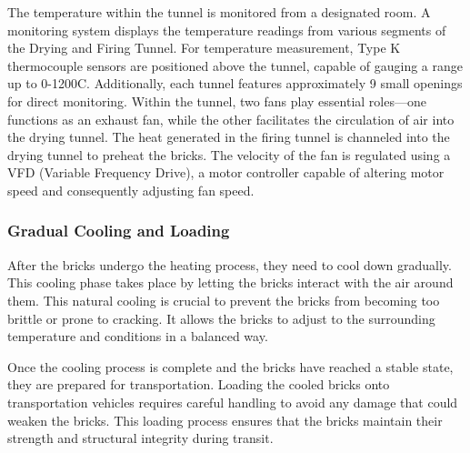 \vspace{0.1cm}
The temperature within the tunnel is monitored from a designated room. A monitoring system displays the temperature readings from various segments of the Drying and Firing Tunnel. For temperature measurement, Type K thermocouple sensors are positioned above the tunnel, capable of gauging a range up to 0-1200\degree C. Additionally, each tunnel features approximately 9 small openings for direct monitoring. Within the tunnel, two fans play essential roles—one functions as an exhaust fan, while the other facilitates the circulation of air into the drying tunnel. The heat generated in the firing tunnel is channeled into the drying tunnel to preheat the bricks. The velocity of the fan is regulated using a VFD (Variable Frequency Drive), a motor controller capable of altering motor speed and consequently adjusting fan speed.

\subsubsection{Gradual Cooling and Loading}
After the bricks undergo the heating process, they need to cool down gradually. This cooling phase takes place by letting the bricks interact with the air around them. This natural cooling is crucial to prevent the bricks from becoming too brittle or prone to cracking. It allows the bricks to adjust to the surrounding temperature and conditions in a balanced way.

Once the cooling process is complete and the bricks have reached a stable state, they are prepared for transportation. Loading the cooled bricks onto transportation vehicles requires careful handling to avoid any damage that could weaken the bricks. This loading process ensures that the bricks maintain their strength and structural integrity during transit.